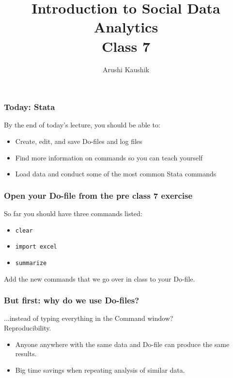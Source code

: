 \documentclass[11pt]{beamer}
\title[Class 7]{Introduction to Social Data Analytics \\
	\bigskip Class 7}
\author[Kaushik]{Arushi Kaushik}
\institute[UCSD]{arkaushi@ucsd.edu}
\date{}
\begin{document}
\frame{\titlepage}


\begin{frame}
\frametitle{Today: Stata}
By the end of today's lecture, you should be able to:
\begin{itemize} \itemsep1em
\item Create, edit, and save Do-files and log files
\item Find more information on commands so you can teach yourself
\item Load data and conduct some of the most common Stata commands
\end{itemize}
\end{frame}

\begin{frame}
\frametitle{Open your Do-file from the pre class 7 exercise}
So far you should have three commands listed:
\begin{itemize} \itemsep1em
	\item \texttt{clear}
	\item \texttt{import excel}
	\item \texttt{summarize}
\end{itemize} \pause \bigskip
Add the new commands that we go over in class to your Do-file.
\end{frame}

\begin{frame}
\frametitle{But first: why do we use Do-files?}
...instead of typing everything in the Command window? \\ \pause \bigskip
\alert{Reproducibility}. \pause \bigskip
\begin{itemize} 
	\item Anyone anywhere with the same data and Do-file can produce the same results. 
	\item Big time savings when repeating analysis of similar data.
\end{itemize}
\end{frame}
\end{document}
